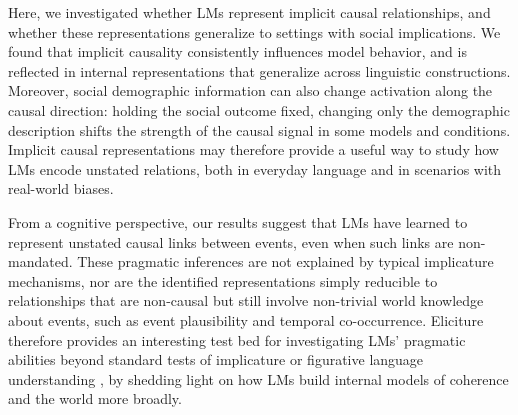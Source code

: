 \documentclass[11pt]{article}
\begin{document}

Here, we investigated whether LMs represent implicit causal relationships, and whether these representations generalize to settings with social implications. We found that implicit causality consistently influences model behavior, and is reflected in internal representations that generalize across linguistic constructions. Moreover, social demographic information can also change activation along the causal direction: holding the social outcome fixed, changing only the demographic description shifts the strength of the causal signal in some models and conditions. Implicit causal representations may therefore provide a useful way to study how LMs encode unstated relations, both in everyday language and in scenarios with real-world biases. 

From a cognitive perspective, our results suggest that LMs have learned to represent unstated causal links between events, even when such links are non-mandated. These pragmatic inferences are not explained by typical implicature mechanisms, nor are the identified representations simply reducible to relationships that are non-causal but still involve non-trivial world knowledge about events, such as event plausibility and temporal co-occurrence. Eliciture therefore provides an interesting test bed for investigating LMs' pragmatic abilities beyond standard tests of implicature or figurative language understanding \citep{pan-kehler-2025-pragmatic}, by shedding light on how LMs build internal models of coherence and the world more broadly.
\end{document}
